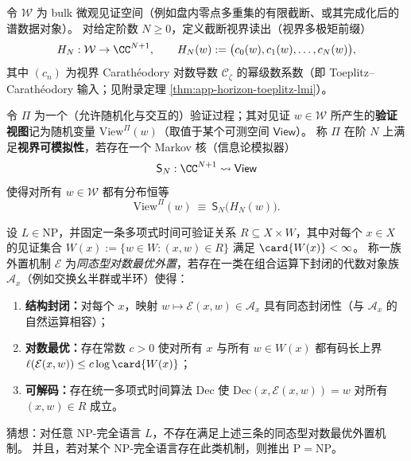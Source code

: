 \begin{definition}[截断视界可观测量与可模拟性语义]\label{def:discussion-horizon-observable-zk}
令 \(\mathcal{W}\) 为 bulk 微观见证空间（例如盘内零点多重集的有限截断、或其完成化后的谱数据对象）。
对给定阶数 \(N\ge 0\)，定义截断视界读出（视界多极矩前缀）
\[
H_N:\mathcal{W}\to \CC^{N+1},\qquad
H_N(w):=\bigl(c_0(w),c_1(w),\dots,c_N(w)\bigr),
\]
其中 \((c_n)\) 为视界 Carath\'eodory 对数导数 \(\mathscr{C}_\zeta\) 的幂级数系数（即 Toeplitz--Carath\'eodory 输入；见附录定理 \ref{thm:app-horizon-toeplitz-lmi}）。
\par
令 \(\Pi\) 为一个（允许随机化与交互的）验证过程；其对见证 \(w\in\mathcal{W}\) 所产生的\textbf{验证视图}记为随机变量 \(\mathrm{View}^{\Pi}(w)\)（取值于某个可测空间 \(\mathsf{View}\)）。
称 \(\Pi\) 在阶 \(N\) 上满足\textbf{视界可模拟性}，若存在一个 Markov 核（信息论模拟器）
\[
\mathsf{S}_N:\CC^{N+1}\rightsquigarrow \mathsf{View}
\]
使得对所有 \(w\in\mathcal{W}\) 都有分布恒等
\[
\mathrm{View}^{\Pi}(w)\ \equiv\ \mathsf{S}_N\bigl(H_N(w)\bigr).
\]
\end{definition}

\begin{conjecture}\label{conj:discussion-homomorphic-log-opt-externalization-pnp}
设 \(L\in\mathrm{NP}\)，并固定一条多项式时间可验证关系 \(R\subseteq X\times W\)，其中对每个 \(x\in X\) 的见证集合 \(W(x):=\{w\in W:(x,w)\in R\}\) 满足 \(\card{W(x)}<\infty\)。
称一族外置机制 \(\mathcal{E}\) 为\emph{同态型对数最优外置}，若存在一类在组合运算下封闭的代数对象族 \(\mathcal{A}_x\)（例如交换幺半群或半环）使得：
\begin{enumerate}
\normalfont
  \item \textbf{结构封闭：}对每个 \(x\)，映射 \(w\mapsto \mathcal{E}(x,w)\in\mathcal{A}_x\) 具有同态封闭性（与 \(\mathcal{A}_x\) 的自然运算相容）；
  \item \textbf{对数最优：}存在常数 \(c>0\) 使对所有 \(x\) 与所有 \(w\in W(x)\) 都有码长上界 \(\ell(\mathcal{E}(x,w))\le c\log\card{W(x)}\)；
  \item \textbf{可解码：}存在统一多项式时间算法 \(\mathrm{Dec}\) 使 \(\mathrm{Dec}(x,\mathcal{E}(x,w))=w\) 对所有 \((x,w)\in R\) 成立。
\end{enumerate}
猜想：对任意 \(\mathrm{NP}\)-完全语言 \(L\)，不存在满足上述三条的同态型对数最优外置机制。
并且，若对某个 \(\mathrm{NP}\)-完全语言存在此类机制，则推出 \(\mathrm{P}=\mathrm{NP}\)。
\end{conjecture}

